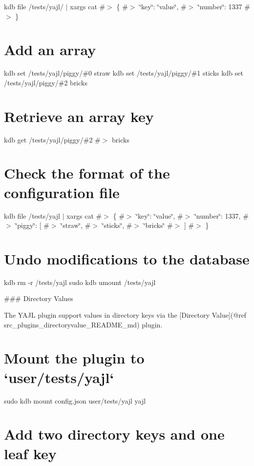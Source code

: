 kdb file /tests/yajl/ $\vert$ xargs cat \#$>$ \{ \#$>$ \char`\"{}key\char`\"{}\+: \char`\"{}value\char`\"{}, \#$>$ \char`\"{}number\char`\"{}\+: 1337 \#$>$ \}\hypertarget{autotoc_md835_autotoc_md849}{}\section{Add an array}\label{autotoc_md835_autotoc_md849}
kdb set /tests/yajl/piggy/\#0 straw kdb set /tests/yajl/piggy/\#1 sticks kdb set /tests/yajl/piggy/\#2 bricks\hypertarget{autotoc_md835_autotoc_md850}{}\section{Retrieve an array key}\label{autotoc_md835_autotoc_md850}
kdb get /tests/yajl/piggy/\#2 \#$>$ bricks\hypertarget{autotoc_md835_autotoc_md851}{}\section{Check the format of the configuration file}\label{autotoc_md835_autotoc_md851}
kdb file /tests/yajl $\vert$ xargs cat \#$>$ \{ \#$>$ \char`\"{}key\char`\"{}\+: \char`\"{}value\char`\"{}, \#$>$ \char`\"{}number\char`\"{}\+: 1337, \#$>$ \char`\"{}piggy\char`\"{}\+: \mbox{[} \#$>$ \char`\"{}straw\char`\"{}, \#$>$ \char`\"{}sticks\char`\"{}, \#$>$ \char`\"{}bricks\char`\"{} \#$>$ \mbox{]} \#$>$ \}\hypertarget{autotoc_md835_autotoc_md852}{}\section{Undo modifications to the database}\label{autotoc_md835_autotoc_md852}
kdb rm -\/r /tests/yajl sudo kdb umount /tests/yajl 
\begin{DoxyCode}
### Directory Values

The YAJL plugin support values in directory keys via the [Directory Value](@ref
       src\_plugins\_directoryvalue\_README\_md) plugin.
\end{DoxyCode}
 \hypertarget{autotoc_md835_autotoc_md853}{}\section{Mount the plugin to `user/tests/yajl`}\label{autotoc_md835_autotoc_md853}
sudo kdb mount config.\+json user/tests/yajl yajl\hypertarget{autotoc_md835_autotoc_md854}{}\section{Add two directory keys and one leaf key}\label{autotoc_md835_autotoc_md854}

